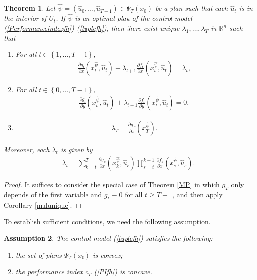 \documentclass[3p]{elsarticle}
\newcommand{\rzn}{\mathbb R^{n}}
\newtheorem{thm}{Theorem}
\newtheorem{assu}[thm]{Assumption}
\begin{document}
	\begin{thm}\label{MPfh}
		Let $\hat \psi=(\hat u_0,\dots, \hat u_{T-1})\in\Psi_T(x_0)$ be a plan such that each $\hat u_t$ is in the interior of $U_t$. If $\hat\psi$ is an optimal plan of the control model (\ref{Performanceindexfh})-(\ref{tuplefh}), then there exist unique $\lambda_1,\dots,\lambda_T$ in $\rzn$ such that
		\begin{enumerate}
			\item[(a)] For all $t\in\left\lbrace 1,\dots, T-1 \right\rbrace $,
			\begin{align}\label{MPXfh}
			\frac{\partial g_t}{\partial x}(x_t^{\hat\psi},\hat u_t)+\lambda_{t+1}\frac{\partial f_t}{\partial x}(x_t^{\hat\psi},\hat u_t)=\lambda_t,
			\end{align}
			\item[(b)] For all $t\in\left\lbrace 0,\dots, T-1 \right\rbrace$,
			\begin{align}\label{MPYfh}
			\frac{\partial g_t}{\partial y}(x_t^{\hat\psi},\hat u_t)+\lambda_{t+1}\frac{\partial f_t}{\partial y}(x_t^{\hat\psi},\hat u_t)=0,
			\end{align}
			\item[(c)] 
			\begin{align}\label{TCfh}
			\lambda_T=\frac{\partial g_T}{\partial x}(x_T^{\hat{\psi}}).
			\end{align}  
		\end{enumerate}
		Moreover, each $\lambda_t$ is given by 
		\begin{align}\label{multipliersfh}
		\lambda_t=\sum_{k=t}^T\frac{\partial g_k}{\partial x}(x_k^{\hat{\psi}},\hat u_k)\prod_{s=t}^{k-1}\frac{\partial f_s}{\partial x}(x_s^{\hat{\psi}},\hat u_s).
		\end{align}
		
	\end{thm}
	
	\begin{proof}
		It suffices to consider the special case of Theorem \ref{MP} in which $g_T$ only depends of the first variable and $g_t\equiv0$ for all $t\ge T+1$, and then apply Corollary \ref{mulunique}.
	\end{proof}
	
	
	
	To establish sufficient conditions, we need the following assumption.
	\begin{assu}
		The control model (\ref{tuplefh}) satisfies the following:
		\begin{enumerate}\label{SuffConfh}
			\item[(a)]  the set of plans $\Psi_T(x_0)$ is convex;	\item[(b)]	the performance index $v_T$ (\ref{PIfh}) is concave.
		\end{enumerate}
	\end{assu}
	
\end{document}
